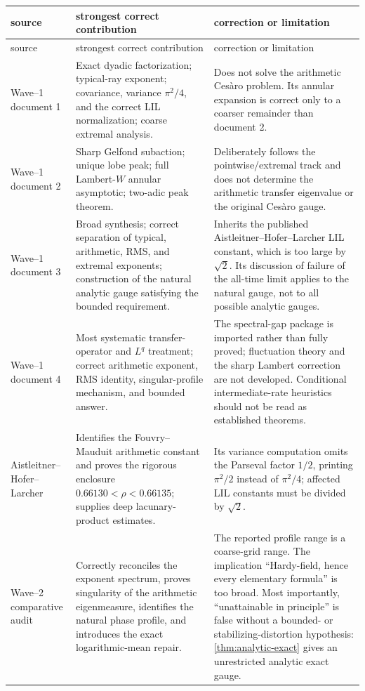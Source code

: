 \documentclass[11pt,oneside]{article}
\theoremstyle{definition}
\theoremstyle{remark}
\begin{document}
\begin{longtable}{@{}p{}p{}p{}@{}}
\toprule
source & strongest correct contribution & correction or limitation\\
\midrule
\endfirsthead
\toprule
source & strongest correct contribution & correction or limitation\\
\midrule
\endhead
Wave--1 document 1
 & Exact dyadic factorization; typical-ray exponent; covariance, variance
 \(\pi^2/4\), and the correct LIL normalization; coarse extremal analysis.
 & Does not solve the arithmetic Ces\`aro problem.  Its annular expansion is
 correct only to a coarser remainder than document 2.\\[0.5em]
Wave--1 document 2
 & Sharp Gelfond subaction; unique lobe peak; full Lambert-\(W\) annular
 asymptotic; two-adic peak theorem.
 & Deliberately follows the pointwise/extremal track and does not determine the
 arithmetic transfer eigenvalue or the original Ces\`aro gauge.\\[0.5em]
Wave--1 document 3
 & Broad synthesis; correct separation of typical, arithmetic, RMS, and
 extremal exponents; construction of the natural analytic gauge satisfying
 the bounded requirement.
 & Inherits the published Aistleitner--Hofer--Larcher LIL constant, which is too
 large by \(\sqrt2\).  Its discussion of failure of the all-time limit applies
 to the natural gauge, not to all possible analytic gauges.\\[0.5em]
Wave--1 document 4
 & Most systematic transfer-operator and \(L^q\) treatment; correct
 arithmetic exponent, RMS identity, singular-profile mechanism, and bounded
 answer.
 & The spectral-gap package is imported rather than fully proved; fluctuation
 theory and the sharp Lambert correction are not developed.  Conditional
 intermediate-rate heuristics should not be read as established theorems.\\[0.5em]
Aistleitner--Hofer--Larcher
 & Identifies the Fouvry--Mauduit arithmetic constant and proves the rigorous
 enclosure \(0.66130<\rho<0.66135\); supplies deep lacunary-product estimates.
 & Its variance computation omits the Parseval factor \(1/2\), printing
 \(\pi^2/2\) instead of \(\pi^2/4\); affected LIL constants must be divided by
 \(\sqrt2\).\\[0.5em]
Wave--2 comparative audit
 & Correctly reconciles the exponent spectrum, proves singularity of the
 arithmetic eigenmeasure, identifies the natural phase profile, and introduces
 the exact logarithmic-mean repair.
 & The reported profile range is a coarse-grid range.  The implication
 ``Hardy-field, hence every elementary formula'' is too broad.  Most
 importantly, ``unattainable in principle'' is false without a bounded- or
 stabilizing-distortion hypothesis: \cref{thm:analytic-exact} gives an
 unrestricted analytic exact gauge.\\
\bottomrule
\end{longtable}
\end{document}
